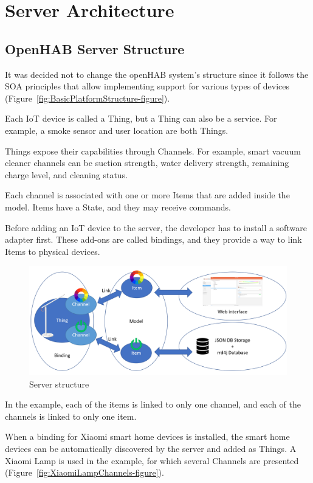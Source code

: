 \section{Server Architecture}
\subsection{OpenHAB Server Structure}

It was decided not to change the openHAB system's structure since it follows the SOA principles that allow implementing support for various types of devices (Figure~\ref{fig:BasicPlatformStructure-figure}).

Each IoT device is called a Thing, but a Thing can also be a service. For example, a smoke sensor and user location are both Things.

Things expose their capabilities through Channels. For example, smart vacuum cleaner channels can be suction strength, water delivery strength, remaining charge level, and cleaning status.

Each channel is associated with one or more Items that are added inside the model. Items have a State, and they may receive commands. 

Before adding an IoT device to the server, the developer has to install a software adapter first. These add-ons are called bindings, and they provide a way to link Items to physical devices.

\begin{figure}
  \centering
  \includegraphics[width=0.9\linewidth]{figures/openHABServerStructure.png}
  \caption{Server structure}
  \label{fig:openHABServerStructure-figure}
\end{figure}

In the example, each of the items is linked to only one channel, and each of the channels is linked to only one item. 

When a binding for Xiaomi smart home devices is installed, the smart home devices can be automatically discovered by the server and added as Things. A Xiaomi Lamp is used in the example, for which several Channels are presented (Figure~\ref{fig:XiaomiLampChannels-figure}).


